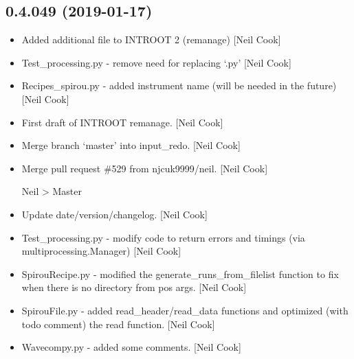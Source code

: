 \documentclass[a4paper,10pt,english]{report}
\begin{document}
\subsection{0.4.049 (2019-01-17)}
\label{\detokenize{misc/changelog:id213}}\begin{itemize}
\item {} 
Added additional file to INTROOT 2 (remanage) {[}Neil Cook{]}

\item {} 
Test\_processing.py - remove need for replacing ‘.py’ {[}Neil Cook{]}

\item {} 
Recipes\_spirou.py - added instrument name (will be needed in the
future) {[}Neil Cook{]}

\item {} 
First draft of INTROOT remanage. {[}Neil Cook{]}

\item {} 
Merge branch ‘master’ into input\_redo. {[}Neil Cook{]}

\item {} 
Merge pull request \#529 from njcuk9999/neil. {[}Neil Cook{]}

Neil \textendash{}\textgreater{} Master

\item {} 
Update date/version/changelog. {[}Neil Cook{]}

\item {} 
Test\_processing.py - modify code to return errors and timings (via
multiprocessing.Manager) {[}Neil Cook{]}

\item {} 
SpirouRecipe.py - modified the generate\_runs\_from\_filelist function to
fix when there is no directory from pos args. {[}Neil Cook{]}

\item {} 
SpirouFile.py - added read\_header/read\_data functions and optimized
(with todo comment) the read function. {[}Neil Cook{]}

\item {} 
Wavecompy.py - added some comments. {[}Neil Cook{]}

\end{itemize}
\end{document}
